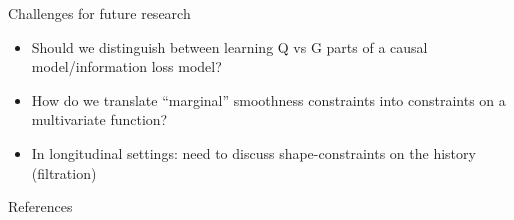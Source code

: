 \documentclass[smaller]{beamer}\usepackage{listings}
\begin{document}
\begin{frame}[label={sec:org6f81043}]{Challenges for future research}
\begin{itemize}
\item Should we distinguish between learning Q vs G parts of a causal
model/information loss model?

\item How do we translate ``marginal'' smoothness constraints into 
constraints on a multivariate function?

\item In longitudinal settings: need to discuss shape-constraints on the
history (filtration)
\end{itemize}
\end{frame}


\begin{frame}[label={sec:org15e6ff6}]{References}
\footnotesize 
\end{frame}
\end{document}
